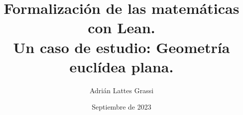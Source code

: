 \documentclass{TFG}
\title{Formalización de las matemáticas con Lean.\\ Un caso de estudio: Geometría euclídea plana.}
\date{Septiembre de 2023}
\author{Adrián Lattes Grassi}
\begin{document}
\maketitle
\emptypage



\tableofcontents
\newpage



\newpage

% 
\end{document}
